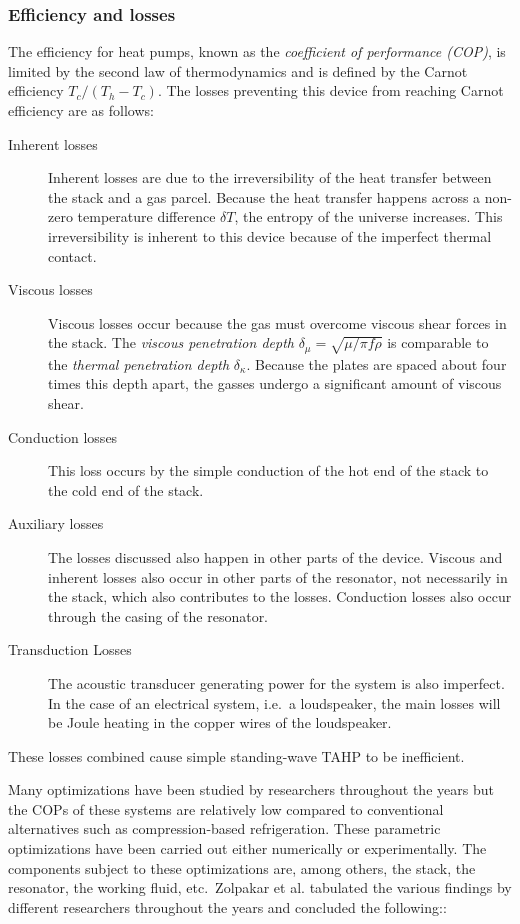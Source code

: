\documentclass[a4paper]{article}
\newcommand{\newpara}
    {
      \bigbreak{}
      \noindent
    }
\begin{document}
\subsubsection{Efficiency and losses}
The efficiency for heat pumps, known as the \emph{coefficient of performance (COP)}, is limited by the second law of thermodynamics and is defined by the Carnot efficiency \(T_c/(T_h-T_c)\). The losses preventing this device from reaching Carnot efficiency are as follows:
\begin{description}
  \item[Inherent losses] Inherent losses are due to the irreversibility of the heat transfer between the stack and a gas parcel. Because the heat transfer happens across a non-zero temperature difference \(\delta T\), the entropy of the universe increases. This irreversibility is inherent to this device because of the imperfect thermal contact. %
  \item[Viscous losses] Viscous losses occur because the gas must overcome viscous shear forces in the stack. The \emph{viscous penetration depth} \(\delta_\mu=\sqrt{\mu / \pi f \rho} \) is comparable to the \emph{thermal penetration depth} \(\delta_\kappa\). Because the plates are spaced about four times this depth apart, the gasses undergo a significant amount of viscous shear.
  \item[Conduction losses] This loss occurs by the simple conduction of the hot end of the stack to the cold end of the stack.
  \item[Auxiliary losses] The losses discussed also happen in other parts of the device. Viscous and inherent losses also occur in other parts of the resonator, not necessarily in the stack, which also contributes to the losses. Conduction losses also occur through the casing of the resonator.
  \item[Transduction Losses] The acoustic transducer generating power for the system is also imperfect. In the case of an electrical system, i.e.\ a loudspeaker, the main losses will be Joule heating in the copper wires of the loudspeaker.
\end{description}
These losses combined cause simple standing-wave TAHP to be inefficient.
\newpara{}
Many optimizations have been studied by researchers throughout the years but the COPs of these systems are relatively low compared to conventional alternatives such as compression-based refrigeration. These parametric optimizations have been carried out either numerically or experimentally. The components subject to these optimizations are, among others, the stack, the resonator, the working fluid, etc.\ Zolpakar et al. tabulated the various findings by different researchers throughout the years and concluded the following:\cite{ZOLPAKAR2016626}:
\end{document}
